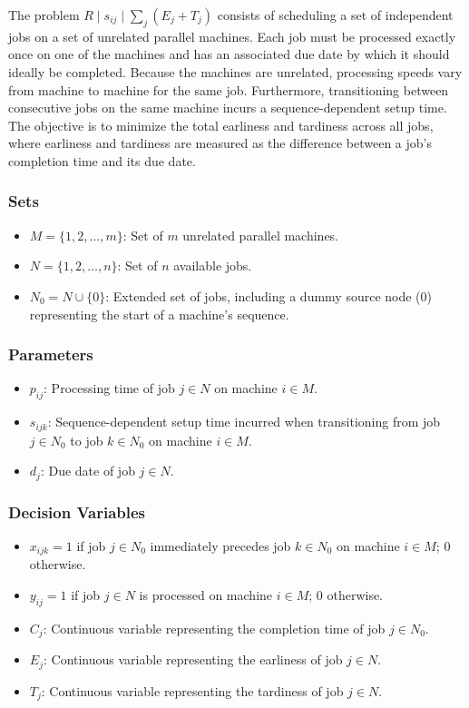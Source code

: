 \documentclass{article}
\begin{document}
The problem $R \mid s_{ij} \mid \sum_j (E_j + T_j)$ consists of scheduling a set of independent jobs on a set of unrelated parallel machines. Each job must be processed exactly once on one of the machines and has an associated due date by which it should ideally be completed. Because the machines are unrelated, processing speeds vary from machine to machine for the same job. Furthermore, transitioning between consecutive jobs on the same machine incurs a sequence-dependent setup time. The objective is to minimize the total earliness and tardiness across all jobs, where earliness and tardiness are measured as the difference between a job's completion time and its due date.

\subsubsection{Sets}

\begin{itemize}
    \item $M = \{1, 2, \ldots, m\}$: Set of $m$ unrelated parallel machines.
    \item $N = \{1, 2, \ldots, n\}$: Set of $n$ available jobs.
    \item $N_0 = N \cup \{0\}$: Extended set of jobs, including a dummy source node ($0$) representing the start of a machine's sequence.
\end{itemize}

\subsubsection{Parameters}

\begin{itemize}
    \item $p_{ij}$: Processing time of job $j \in N$ on machine $i \in M$.
    \item $s_{ijk}$: Sequence-dependent setup time incurred when transitioning from job $j \in N_0$ to job $k \in N_0$ on machine $i \in M$.
    \item $d_j$: Due date of job $j \in N$.
\end{itemize}

\subsubsection{Decision Variables}

\begin{itemize}
    \item $x_{ijk} = 1$ if job $j \in N_0$ immediately precedes job $k \in N_0$ on machine $i \in M$; $0$ otherwise.
    \item $y_{ij} = 1$ if job $j \in N$ is processed on machine $i \in M$; $0$ otherwise.
    \item $C_j$: Continuous variable representing the completion time of job $j \in N_0$.
    \item $E_j$: Continuous variable representing the earliness of job $j \in N$.
    \item $T_j$: Continuous variable representing the tardiness of job $j \in N$.
\end{itemize}
\end{document}
